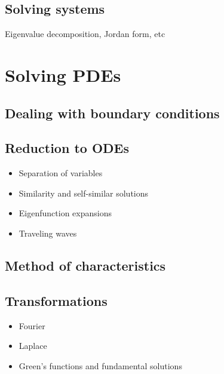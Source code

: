 \subsection{Solving systems}

Eigenvalue decomposition, Jordan form, etc



\section{Solving PDEs}

\subsection{Dealing with boundary conditions}

\subsection{Reduction to ODEs}

\begin{itemize}
    \item Separation of variables
    \item Similarity and self-similar solutions 
    \item Eigenfunction expansions
    \item Traveling waves
\end{itemize}

\subsection{Method of characteristics}



\subsection{Transformations}

\begin{itemize}
    \item Fourier
    \item Laplace
    \item Green's functions and fundamental solutions
\end{itemize}





